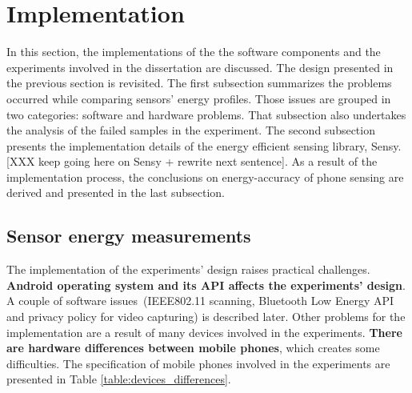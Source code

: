 \section{Implementation}
\label{s:implementation}
\hspace{10pt} In this section, the implementations of the the software components and the experiments involved in the dissertation are discussed. The design presented in the previous section is revisited. The first subsection summarizes the problems occurred while comparing sensors' energy profiles. Those issues are grouped in two categories: software and hardware problems. That subsection also undertakes the analysis of the failed samples in the experiment. The second subsection presents the implementation details of the energy efficient sensing library, Sensy. [XXX keep going here on Sensy + rewrite next sentence]. As a result of the implementation process, the conclusions on energy-accuracy of phone sensing are derived and presented in the last subsection.

\subsection{Sensor energy measurements}
\hspace{10pt} The implementation of the experiments' design raises practical challenges. \textbf{Android operating system and its API affects the experiments' design}. A couple of software issues\ (IEEE802.11 scanning, Bluetooth Low Energy API and privacy policy for video capturing) is described later. Other problems for the implementation are a result of many devices involved in the experiments. \textbf{There are hardware differences between mobile phones},  which creates some difficulties. The specification of mobile phones involved in the experiments are presented in Table \ref{table:devices_differences}.
	
